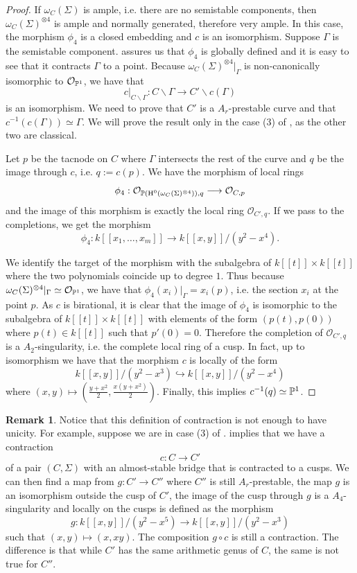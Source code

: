 \documentclass{alggeom}
\numberwithin{equation}{section}
\numberwithin{subsection}{section}
\theoremstyle{definition}
\newtheorem{remark}[theorem]{Remark}
\theoremstyle{remark}
\newcommand\cO{\mathcal{O}} \newcommand\cP{\mathcal{P}}
\renewcommand\H{\operatorname{H}}
\renewcommand{\setminus}{\smallsetminus}
\begin{document}
\begin{proof}
If $\omega_C(\Sigma)$ is ample, i.e. there are no semistable components, then $\omega_C(\Sigma)^{\otimes 4}$ is ample and normally generated, therefore very ample. In this case, the morphism $\phi_4$ is a closed embedding and $c$ is an isomorphism. Suppose $\Gamma$ is the semistable component.  assures us that $\phi_4$ is globally defined and it is easy to see that it contracts $\Gamma$ to a point. Because $\omega_C(\Sigma)^{\otimes 4}\vert_{\Gamma}$ is non-canonically isomorphic to $\cO_{\PP^1}$, we have that $$c\vert_{C\setminus \Gamma}:C\setminus \Gamma \longrightarrow C' \setminus c(\Gamma)$$   
is an isomorphism. We need to prove that $C'$ is a $A_r$-prestable curve and that $c^{-1}(c(\Gamma))\simeq \Gamma$. We will prove the result only in the case (3) of , as the other two are classical. 

Let $p$ be the tacnode on $C$ where $\Gamma$ intersects the rest of the curve and $q$ be the image through $c$, i.e. $q:=c(p)$. We have the morphism of local rings
$$ \phi_4: \cO_{\PP(\H^0(\omega_C(\Sigma)^{\otimes 4})),q} \longrightarrow \cO_{C,p}$$
and the image of this morphism is exactly the local ring $\cO_{C',q}$. If we pass to the completions, we get the morphism 
$$ \phi_4: k[[x_1,\dots,x_m]] \longrightarrow k[[x,y]]/(y^2-x^4).$$

We identify the target of the morphism with the subalgebra of $k[[t]]\times k[[t]]$ where the two polynomials coincide up to degree $1$. Thus because  
$\omega_C(\Sigma)^{\otimes 4}\vert_{\Gamma}\simeq \cO_{\PP^1}$, we have that $\phi_4(x_i)\vert_{\Gamma}=x_i(p)$, i.e. the section $x_i$ at the point $p$. As $c$ is birational, it is clear that the image of $\phi_4$ is isomorphic to the subalgebra of $k[[t]]\times k[[t]]$ with elements of the form $(p(t),p(0))$ where $p(t) \in k[[t]]$ such that $p'(0)=0$. Therefore the completion of $\cO_{C',q}$ is a $A_2$-singularity, i.e. the complete local ring of a cusp. In fact, up to isomorphism we have that the morphism $c$ is locally of the form
$$ k[[x,y]]/(y^2-x^3) \hookrightarrow k[[x,y]]/(y^2-x^4) $$
where $(x,y) \mapsto (\frac{y+x^2}{2}, \frac{x(y+x^2)}{2})$. Finally, this implies $c^{-1}(q)\simeq \mathbb{P}^1$.
 \end{proof}


\begin{remark}
 Notice that this definition of contraction is not enough to have unicity. For example, suppose we are in case (3) of .  implies that we have a contraction $$c:C \longrightarrow C'$$ of a pair $(C,\Sigma)$ with an almost-stable bridge that is contracted to a cusps. We can then find a map from $g:C' \rightarrow C''$ where $C''$ is still $A_r$-prestable, the map $g$ is an isomorphism outside the cusp of $C'$, the image of the cusp through $g$ is a $A_4$-singularity and locally on the cusps is defined as the morphism 
 $$ g: k[[x,y]]/(y^2-x^5) \longrightarrow k[[x,y]]/(y^2-x^3) $$ 
 such that $(x,y) \mapsto (x,xy)$. The composition $g\circ c$ is still a contraction. The difference is that while $C'$ has the same arithmetic genus of $C$, the same is not true for $C''$.
\end{remark}
\end{document}
